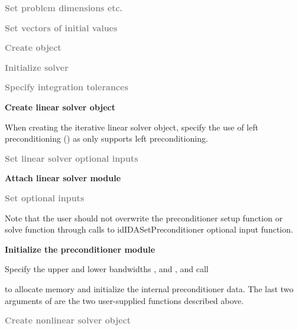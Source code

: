 {\begin{Steps}
\item
  \textcolor{gray}{\bf Set problem dimensions etc.}

\item
  \textcolor{gray}{\bf Set vectors of initial values}

\item
  \textcolor{gray}{\bf Create {\idas} object}

\item
  \textcolor{gray}{\bf Initialize {\idas} solver}

\item
  \textcolor{gray}{\bf Specify integration tolerances}

\item
  {\bf Create linear solver object}

  When creating the iterative linear solver object, specify the use of
  left preconditioning () as {\idas} only supports left preconditioning.

\item
  \textcolor{gray}{\bf Set linear solver optional inputs}

\item \label{i:bbdpre_attach}
  {\bf Attach linear solver module}

\item
  \textcolor{gray}{\bf Set optional inputs}

  Note that the user should not overwrite the preconditioner setup function
  or solve function through calls to id{IDASetPreconditioner}
  optional input function.
  
\item \label{i:bbdpre_init}
  {\bf Initialize the {\idabbdpre} preconditioner module}

  Specify the upper and lower bandwidths ,  and
  ,  and call


  to allocate memory and initialize the internal preconditioner data.
  The last two arguments of  are the two user-supplied
  functions described above.

\item
  \textcolor{gray}{\bf Create nonlinear solver object}


\end{Steps}}
